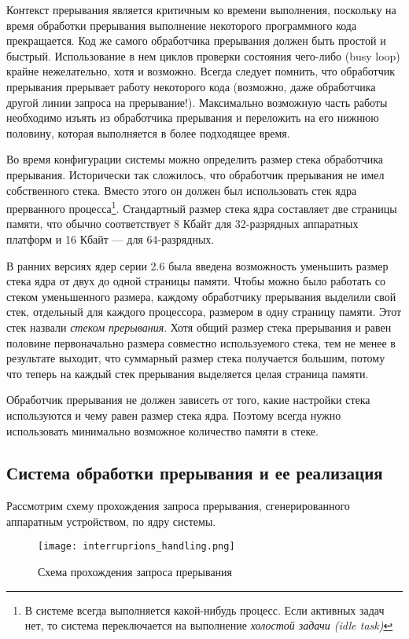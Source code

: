 Контекст прерывания является критичным ко времени выполнения, поскольку на время обработки прерывания выполнение некоторого программного кода прекращается.
Код же самого обработчика прерывания должен быть простой и быстрый. Использование в нем циклов проверки состояния чего-либо (busy loop) крайне нежелательно, хотя и возможно. Всегда следует помнить, что обработчик прерывания прерывает работу некоторого кода (возможно, даже обработчика другой линии запроса на прерывание!). Максимально возможную часть работы необходимо изъять из обработчика прерывания и переложить на его нижнюю половину, которая выполняется в более подходящее время.


Во время конфигурации системы можно определить размер стека обработчика прерывания. Исторически так сложилось, что обработчик прерывания не имел собственного стека. Вместо этого он должен был использовать стек ядра прерванного процесса\footnote{В системе всегда выполняется какой-нибудь процесс. Если активных задач нет, то система переключается на выполнение \textit{холостой задачи (idle task)}}. Стандартный размер стека ядра составляет две страницы памяти, что обычно соответствует 8 Кбайт для 32-разрядных аппаратных платформ и 16 Кбайт — для 64-разрядных.

В ранних версиях ядер серии 2.6 была введена возможность уменьшить размер стека
ядра от двух до одной страницы памяти. Чтобы можно было работать со стеком уменьшенного размера, каждому обработчику прерывания выделили свой стек, отдельный для каждого процессора, размером в одну страницу памяти. Этот стек назвали \textit{стеком прерывания}. Хотя общий размер стека прерывания и равен половине первоначально размера совместно используемого стека,
тем не менее в результате выходит, что суммарный размер стека получается большим,
потому что теперь на каждый стек прерывания выделяется целая страница памяти.

Обработчик прерывания не должен зависеть от того, какие настройки стека используются и чему равен размер стека ядра. Поэтому всегда нужно использовать минимально возможное количество памяти в стеке.

\subsection{Система обработки прерывания и ее реализация}

Рассмотрим схему прохождения запроса прерывания, сгенерированного аппаратным устройством, по ядру системы.

\begin{figure}[h]
\texttt{[image: interruprions\_handling.png]}
\caption{Схема прохождения запроса прерывания}
\end{figure}

